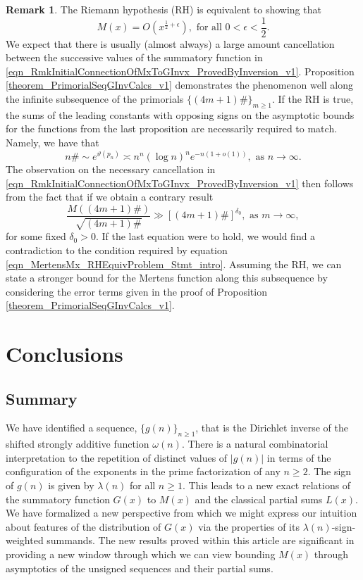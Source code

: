 \documentclass[11pt,reqno,a4letter]{article}
\newcommand{\hlocalref}[1]{\hyperref[#1]{\ref{#1}}}
\numberwithin{equation}{section}
\numberwithin{figure}{section}
\numberwithin{table}{section}
\theoremstyle{plain}
\numberwithin{theorem}{section}
\theoremstyle{definition}
\newtheorem{remark}[theorem]{Remark}
\begin{document}
\begin{remark}
\label{remark_LocalCancellationWithGxAlongThePrimorialsUnderTheRH} 
The Riemann hypothesis (RH) is equivalent to showing that 
\begin{equation} 
\label{eqn_MertensMx_RHEquivProblem_Stmt_intro} 
M(x) = O\left(x^{\frac{1}{2}+\epsilon}\right), \text{ for all } 0 < \epsilon < \frac{1}{2}.
\end{equation}
We expect that there is usually (almost always) 
a large amount cancellation between the successive 
values of the summatory function in 
\eqref{eqn_RmkInitialConnectionOfMxToGInvx_ProvedByInversion_v1}. 
Proposition \hlocalref{theorem_PrimorialSeqGInvCalcs_v1} 
demonstrates the phenomenon well along the infinite 
subsequence of the primorials $\{(4m+1)\#\}_{m \geq 1}$. 
If the RH is true, the sums of the leading constants with opposing signs 
on the asymptotic bounds for the functions from the last proposition 
are necessarily required to match. 
Namely, we have that 
\cite{DUSART-1999,DUSART-2010} 
\[
n\# \sim e^{\vartheta(p_n)} \asymp n^n (\log n)^n e^{-n(1+o(1))}, 
     \text{ as } n \rightarrow \infty. 
\]
The observation on the necessary cancellation in 
\eqref{eqn_RmkInitialConnectionOfMxToGInvx_ProvedByInversion_v1}
then follows from the fact that if we obtain a contrary result  
\[
\frac{M((4m+1)\#)}{\sqrt{(4m+1)\#}} \gg \left[(4m+1)\#\right]^{\delta_0}, 
     \text{ as } m \rightarrow \infty, 
\]
for some fixed $\delta_0 > 0$. 
If the last equation were to hold, we would find a contradiction to the 
condition required by equation \eqref{eqn_MertensMx_RHEquivProblem_Stmt_intro}. 
Assuming the RH, we can state a stronger bound for the 
Mertens function along this subsequence by considering the 
error terms given in the proof of 
Proposition \hlocalref{theorem_PrimorialSeqGInvCalcs_v1}. 
\end{remark}

\section{Conclusions}

\subsection{Summary}

We have identified a sequence, 
$\{g(n)\}_{n \geq 1}$, that is the Dirichlet inverse of the 
shifted strongly additive function $\omega(n)$. 
There is a natural 
combinatorial interpretation to the repetition of distinct values 
of $|g(n)|$ in terms of the configuration of the 
exponents in the prime factorization of any $n \geq 2$. 
The sign of $g(n)$ is given by $\lambda(n)$ for all $n \geq 1$. 
This leads to a new exact relations of the 
summatory function $G(x)$ to $M(x)$ and the classical partial sums $L(x)$. 
We have formalized a new perspective from which we might express 
our intuition about features of the distribution of $G(x)$ 
via the properties of its $\lambda(n)$-sign-weighted summands.
The new results proved within this article 
are significant in providing a new window through which we can view bounding $M(x)$ 
through asymptotics of the unsigned sequences and their partial sums. 
\end{document}
